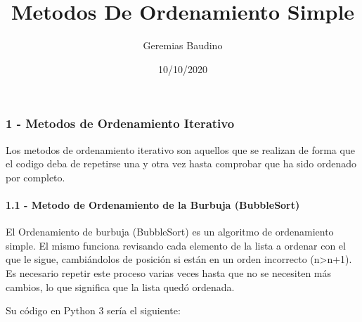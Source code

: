 \documentclass[
]{article}
\title{Metodos De Ordenamiento Simple}
\author{Geremias Baudino}
\date{10/10/2020}
\begin{document}
\maketitle

\hypertarget{metodos-de-ordenamiento-iterativo}{%
\subsubsection{1 - Metodos de Ordenamiento
Iterativo}\label{metodos-de-ordenamiento-iterativo}}

Los metodos de ordenamiento iterativo son aquellos que se realizan de
forma que el codigo deba de repetirse una y otra vez hasta comprobar que
ha sido ordenado por completo.

\hypertarget{metodo-de-ordenamiento-de-la-burbuja-bubblesort}{%
\paragraph{1.1 - Metodo de Ordenamiento de la Burbuja
(BubbleSort)}\label{metodo-de-ordenamiento-de-la-burbuja-bubblesort}}

El Ordenamiento de burbuja (BubbleSort) es un algoritmo de ordenamiento
simple. El mismo funciona revisando cada elemento de la lista a ordenar
con el que le sigue, cambiándolos de posición si están en un orden
incorrecto (n\textgreater n+1). Es necesario repetir este proceso varias
veces hasta que no se necesiten más cambios, lo que significa que la
lista quedó ordenada.

Su código en Python 3 sería el siguiente:
\end{document}
